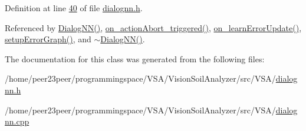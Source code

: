 Definition at line \hyperlink{dialognn_8h_source_l00040}{40} of file \hyperlink{dialognn_8h_source}{dialognn.\+h}.



Referenced by \hyperlink{dialognn_8cpp_source_l00004}{Dialog\+N\+N()}, \hyperlink{dialognn_8cpp_source_l00147}{on\+\_\+action\+Abort\+\_\+triggered()}, \hyperlink{dialognn_8cpp_source_l00050}{on\+\_\+learn\+Error\+Update()}, \hyperlink{dialognn_8cpp_source_l00058}{setup\+Error\+Graph()}, and \hyperlink{dialognn_8cpp_source_l00042}{$\sim$\+Dialog\+N\+N()}.



The documentation for this class was generated from the following files\+:\begin{DoxyCompactItemize}
\item 
/home/peer23peer/programmingspace/\+V\+S\+A/\+Vision\+Soil\+Analyzer/src/\+V\+S\+A/\hyperlink{dialognn_8h}{dialognn.\+h}\item 
/home/peer23peer/programmingspace/\+V\+S\+A/\+Vision\+Soil\+Analyzer/src/\+V\+S\+A/\hyperlink{dialognn_8cpp}{dialognn.\+cpp}\end{DoxyCompactItemize}
